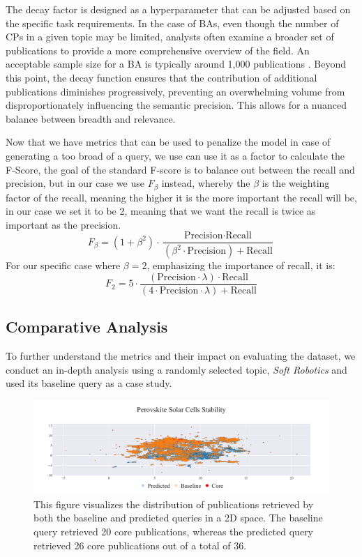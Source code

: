 The decay factor is designed as a hyperparameter that can be adjusted based on the specific task requirements. In the case of BAs, even though the number of CPs in a given topic may be limited, analysts often examine a broader set of publications to provide a more comprehensive overview of the field. An acceptable sample size for a BA is typically around 1,000 publications \autocite{Rogers2020}. Beyond this point, the decay function ensures that the contribution of additional publications diminishes progressively, preventing an overwhelming volume from disproportionately influencing the semantic precision. This allows for a nuanced balance between breadth and relevance.

Now that we have metrics that can be used to penalize the model in case of generating a too broad of a query, we use can use it as a factor to calculate the F-Score, the goal of the standard F-score is to balance out between the recall and precision, but in our case we use $F_\beta$ instead, whereby the $\beta$ is the weighting factor of the recall, meaning the higher it is the more important the recall will be, in our case we set it to be 2, meaning that we want the recall is twice as important as the precision.
\begin{equation}\label{eq:f-beta}
F_\beta = (1 + \beta^2) \cdot \frac{\text{Precision} \cdot \text{Recall}}{(\beta^2 \cdot \text{Precision}) + \text{Recall}}
\end{equation}
For our specific case where $\beta = 2$, emphasizing the importance of recall, it is:
\[
	F_2 = 5 \cdot \frac{(\text{Precision} \cdot \lambda) \cdot \text{Recall}}{(4 \cdot \text{Precision}\cdot \lambda) + \text{Recall}}
\]

\subsection*{Comparative Analysis}
To further understand the metrics and their impact on evaluating the dataset, we conduct an in-depth analysis using a randomly selected topic, \textit{Soft Robotics} and used its baseline query as a case study.

\begin{figure}[!ht]
	\hspace*{-1cm}	
	\includegraphics[scale=0.45]{pics/sr-landscape.pdf}
	\caption[Embedding of Soft Robotics]{This figure visualizes the distribution of publications retrieved by both the baseline and predicted queries in a 2D space. The baseline query retrieved 20 core publications, whereas the predicted query retrieved 26 core publications out of a total of 36.}\label{fig:sr-landscape}
\end{figure}

